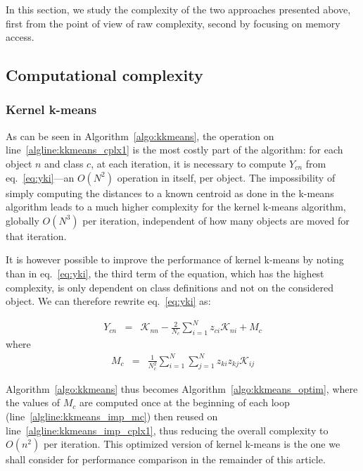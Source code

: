 \documentclass[natbib,smallextended]{svjour3}
\newcommand{\cad}{---} %
\begin{document}
In this section, we study the complexity of the two approaches presented above, first from the point of view of raw complexity, second by focusing on memory access.

\subsection{Computational complexity}

\subsubsection{Kernel k-means}

As can be seen in Algorithm~\ref{algo:kkmeans}, the operation on line~\ref{algline:kkmeans_cplx1} is the most costly part of the algorithm: for each object $n$ and class $c$, at each iteration, it is necessary to compute $Y_{cn}$ from eq.~\ref{eq:yki}\cad{}an $O(N^2)$ operation in itself, per object. The impossibility of simply computing the distances to a known centroid as done in the k-means algorithm leads to a much higher complexity for the kernel k-means algorithm, globally $O(N^3)$ per iteration, independent of how many objects are moved for that iteration.

It is however possible to improve the performance of kernel k-means by noting than in eq.~\ref{eq:yki}, the third term of the equation, which has the highest complexity, is only dependent on class definitions and not on the considered object. We can therefore rewrite eq.~\ref{eq:yki} as:

\begin{eqnarray}
Y_{cn} & = & \mathcal{K}_{nn} - \frac{2}{N_c} \sum_{i=1}^{N} z_{ci} \mathcal{K}_{ni} + M_c \label{eq:yki_improved}
\end{eqnarray}
where
\begin{eqnarray}
M_c    & = & \frac{1}{N_c^2} \sum_{i=1}^{N} \sum_{j=1}^{N} z_{ki} z_{kj} \mathcal{K}_{ij} \label{eq:mc}
\end{eqnarray}

Algorithm~\ref{algo:kkmeans} thus becomes Algorithm~\ref{algo:kkmeans_optim}, where the values of $M_c$ are computed once at the beginning of each loop (line~\ref{algline:kkmeans_imp_mc}) then reused on line~\ref{algline:kkmeans_imp_cplx1}, thus reducing the overall complexity to $O(n^2)$ per iteration. This optimized version of kernel k-means is the one we shall consider for performance comparison in the remainder of this article.
\end{document}
